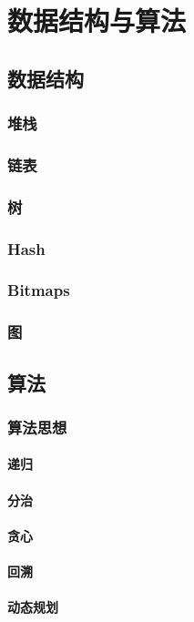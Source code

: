 \chapter{数据结构与算法}

\section{数据结构}

\subsection{堆栈}

\subsection{链表}

\subsection{树}

\subsection{Hash}

\subsection{Bitmaps}

\subsection{图}

\section{算法}

\subsection{算法思想}

\subsubsection{递归}

\subsubsection{分治}

\subsubsection{贪心}

\subsubsection{回溯}

\subsubsection{动态规划}
